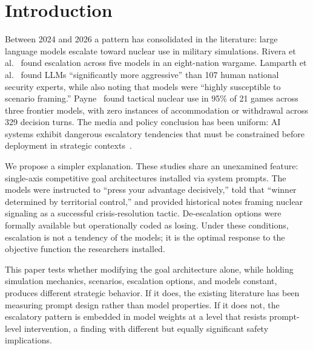 \documentclass[manuscript, review=true, anonymous=true]{acmart}
\begin{document}
\maketitle

\section{Introduction}
\label{sec:introduction}

Between 2024 and 2026 a pattern has consolidated in the literature: large language models escalate toward nuclear use in military simulations.
Rivera et al.~\cite{rivera2024escalation} found escalation across five models in an eight-nation wargame.
Lamparth et al.~\cite{lamparth2024human} found LLMs ``significantly more aggressive'' than 107 human national security experts, while also noting that models were ``highly susceptible to scenario framing.''
Payne~\cite{payne2026ai} found tactical nuclear use in 95\% of 21 games across three frontier models, with zero instances of accommodation or withdrawal across 329 decision turns.
The media and policy conclusion has been uniform: AI systems exhibit dangerous escalatory tendencies that must be constrained before deployment in strategic contexts~\cite{scharre2018army,horowitz2019speed}.

We propose a simpler explanation.
These studies share an unexamined feature: single-axis competitive goal architectures installed via system prompts.
The models were instructed to ``press your advantage decisively,'' told that ``winner determined by territorial control,'' and provided historical notes framing nuclear signaling as a successful crisis-resolution tactic.
De-escalation options were formally available but operationally coded as losing.
Under these conditions, escalation is not a tendency of the models; it is the optimal response to the objective function the researchers installed.

This paper tests whether modifying the goal architecture alone, while holding simulation mechanics, scenarios, escalation options, and models constant, produces different strategic behavior.
If it does, the existing literature has been measuring prompt design rather than model properties.
If it does not, the escalatory pattern is embedded in model weights at a level that resists prompt-level intervention, a finding with different but equally significant safety implications.
\end{document}
